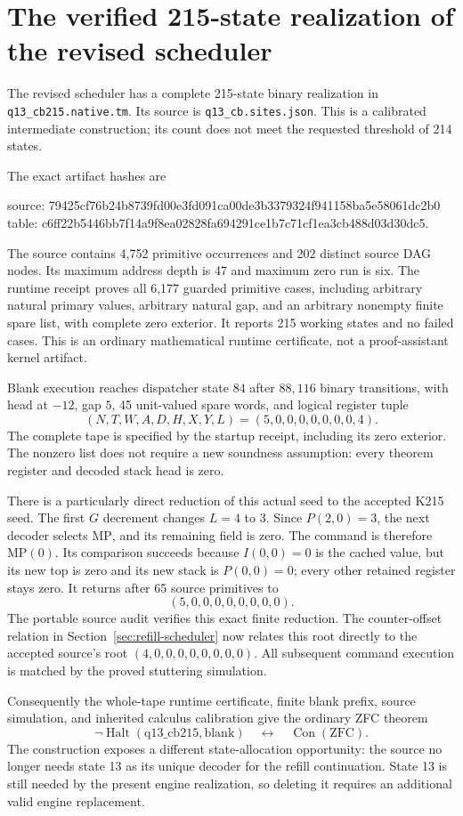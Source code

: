 \section{The verified 215-state realization of the revised scheduler}
\label{sec:scheduler-realization}

The revised scheduler has a complete 215-state binary realization in
\texttt{q13\_cb215.native.tm}. Its source is
\texttt{q13\_cb.sites.json}. This is a calibrated intermediate construction;
its count does not meet the requested threshold of 214 states.

The exact artifact hashes are
\begin{center}\ttfamily\footnotesize
source: 79425cf76b24b8739fd00e3fd091ca00de3b3379324f941158ba5e58061dc2b0\\
table: c6ff22b5446bb7f14a9f8ea02828fa694291ce1b7c71cf1ea3cb488d03d30dc5.
\end{center}
The source contains 4,752 primitive occurrences and 202 distinct source
DAG nodes. Its maximum address depth is 47 and maximum zero run is six.
The runtime receipt proves all 6,177 guarded primitive cases, including
arbitrary natural primary values, arbitrary natural gap, and an arbitrary
nonempty finite spare list, with complete zero exterior. It reports
215 working states and no failed cases. This is an ordinary mathematical
runtime certificate, not a proof-assistant kernel artifact.

Blank execution reaches dispatcher state $84$ after $88{,}116$ binary
transitions, with head at $-12$, gap $5$, 45 unit-valued spare words, and
logical register tuple
\[
 (N,T,W,A,D,H,X,Y,L)=(5,0,0,0,0,0,0,0,4).
\]
The complete tape is specified by the startup receipt, including its
zero exterior. The nonzero list does not require a new soundness
assumption: every theorem register and decoded stack head is zero.

There is a particularly direct reduction of this actual seed to the
accepted K215 seed. The first $G$ decrement changes $L=4$ to $3$.
Since $P(2,0)=3$, the next decoder selects $\mathrm{MP}$, and its
remaining field is zero. The command is therefore $\mathrm{MP}(0)$.
Its comparison succeeds because $I(0,0)=0$ is the cached value, but its
new top is zero and its new stack is $P(0,0)=0$; every other retained
register stays zero. It returns after 65 source primitives to
\[
 (5,0,0,0,0,0,0,0,0).
\]
The portable source audit verifies this exact finite reduction. The
counter-offset relation in Section~\ref{sec:refill-scheduler} now relates
this root directly to the accepted source's root
$(4,0,0,0,0,0,0,0,0)$. All subsequent command execution is matched by
the proved stuttering simulation.

Consequently the whole-tape runtime certificate, finite blank prefix,
source simulation, and inherited calculus calibration give the ordinary
ZFC theorem
\[
 \neg\operatorname{Halt}(\mathrm{q13\_cb215},\mathrm{blank})
 \quad\longleftrightarrow\quad
 \operatorname{Con}(\mathrm{ZFC}).
\]
The construction exposes a different state-allocation opportunity:
the source no longer needs state 13 as its unique decoder for the refill
continuation. State 13 is still needed by the present engine realization,
so deleting it requires an additional valid engine replacement.
